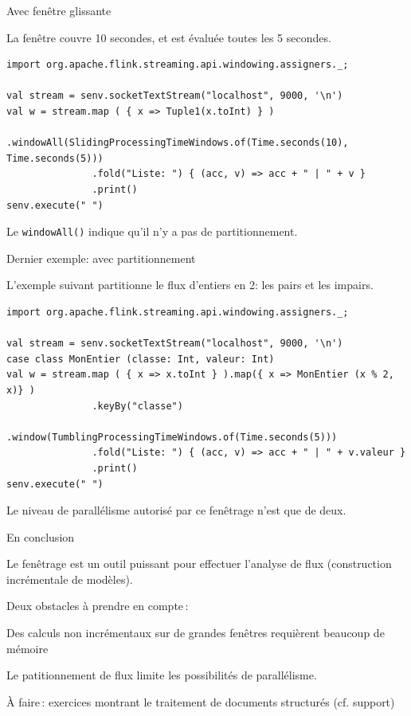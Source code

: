 \begin{frame}[fragile]{Avec fenêtre glissante}

La fenêtre couvre 10 secondes, et est évaluée toutes les 5 secondes.
\vfill

\begin{verbatim}
import org.apache.flink.streaming.api.windowing.assigners._;

val stream = senv.socketTextStream("localhost", 9000, '\n')
val w = stream.map ( { x => Tuple1(x.toInt) } )
               .windowAll(SlidingProcessingTimeWindows.of(Time.seconds(10), Time.seconds(5)))
               .fold("Liste: ") { (acc, v) => acc + " | " + v }
               .print()
senv.execute(" ")
\end{verbatim}

\vfill

Le \texttt{windowAll()} indique qu'il n'y a pas de partitionnement. 
\end{frame}


\begin{frame}[fragile]{Dernier exemple: avec partitionnement}

L’exemple suivant partitionne le flux d’entiers en 2: les pairs et les impairs.

\vfill

\begin{verbatim}
import org.apache.flink.streaming.api.windowing.assigners._;

val stream = senv.socketTextStream("localhost", 9000, '\n')
case class MonEntier (classe: Int, valeur: Int)
val w = stream.map ( { x => x.toInt } ).map({ x => MonEntier (x % 2, x)} )
               .keyBy("classe")
               .window(TumblingProcessingTimeWindows.of(Time.seconds(5)))
               .fold("Liste: ") { (acc, v) => acc + " | " + v.valeur }
               .print()
senv.execute(" ")
\end{verbatim}

\vfill
\begin{blocgauche}
Le niveau de parallélisme autorisé par ce fenêtrage n’est que de deux.
\end{blocgauche}
\end{frame}


\begin{frame}[fragile]{En conclusion}

Le fenêtrage est un outil puissant pour effectuer l'analyse de flux (construction incrémentale de modèles).

\vfill

Deux obstacles à prendre en compte\,:
\begin{redbullet}
 \item Des calculs non incrémentaux sur de grandes fenêtres requièrent beaucoup de mémoire
 \item Le patitionnement de flux limite les possibilités de parallélisme.
\end{redbullet}

\vfill
\begin{blocgauche}
 À faire\,: exercices montrant le traitement de documents 
 structurés (cf. support)
 \end{blocgauche}
\end{frame}